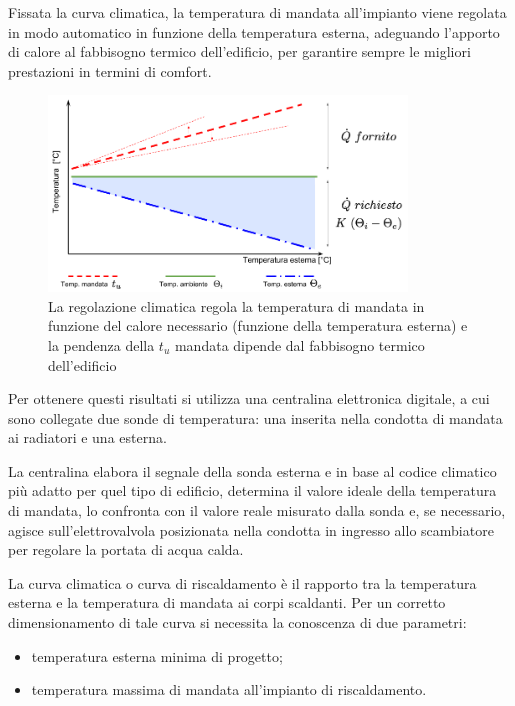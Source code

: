 \documentclass[laurea,oneside,11pt]{USiena_tesiLM3}
\begin{document}
Fissata la curva climatica, la temperatura di mandata all'impianto viene regolata in modo automatico in funzione della temperatura esterna, adeguando l'apporto di calore al fabbisogno termico dell'edificio, per garantire sempre le migliori prestazioni in termini di comfort. 

\begin{figure}[!ht]
\centering
\includegraphics[width=0.85\textwidth]{figure/climatica} 
\caption{La regolazione climatica regola la temperatura di mandata in funzione del calore necessario (funzione della temperatura esterna) e la pendenza della $t_u$ mandata dipende dal fabbisogno termico dell'edificio}
\label{fig:surplus}
\end{figure}

Per ottenere questi risultati si utilizza una centralina elettronica digitale, a cui sono collegate due sonde di temperatura: una inserita nella condotta di mandata ai radiatori e una esterna. 

La centralina elabora il segnale della sonda esterna e in base al codice climatico più adatto per quel tipo di edificio, determina il valore ideale della temperatura di mandata, lo confronta con il valore reale misurato dalla sonda e, se necessario, agisce sull'elettrovalvola posizionata nella condotta in ingresso allo scambiatore per regolare la portata di acqua calda.

La curva climatica o curva di riscaldamento è il rapporto tra la temperatura esterna e la temperatura di mandata ai corpi scaldanti. Per un corretto dimensionamento di tale curva si necessita la conoscenza di due parametri:
\begin{itemize}
\item temperatura esterna minima di progetto;
\item temperatura massima di mandata all'impianto di riscaldamento.
\end{itemize}
\end{document}
